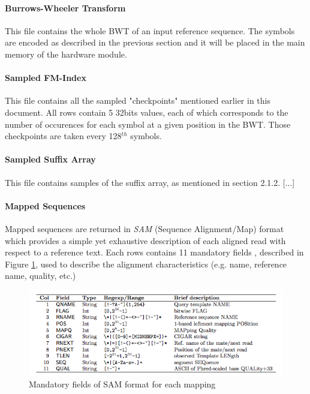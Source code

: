 \paragraph{Burrows-Wheeler Transform}

This file contains the whole BWT of an input reference sequence. The symbols are encoded as described in the previous section and it will be placed in the main memory of the hardware module.

\paragraph{Sampled FM-Index}

This file contains all the sampled "checkpoints" mentioned earlier in this document. All rows contain 5 32bits values, each of which corresponds to the number of occurences for each symbol at a given position in the BWT. Those checkpoints are taken every 128$^{th}$ symbols.

\paragraph{Sampled Suffix Array}

This file contains samples of the suffix array, as mentioned in section 2.1.2.
[...]

\paragraph{Mapped Sequences}

Mapped sequences are returned in \textsl{SAM}  (Sequence Alignment/Map) format which provides a simple yet exhaustive description of each aligned read with respect to a reference text. Each rows contains 11 mandatory fields
, described in Figure \ref{fig:samf}, used to describe the alignment characteristics (e.g. name, reference name, quality, etc.) \\

\begin{figure}[H]
    \centering
    \includegraphics[scale = 0.78]{Figures/SAMv1_3.png}
    \caption{Mandatory fields of SAM format for each mapping}
    \label{fig:samf}
\end{figure}
\vspace*{4mm}



